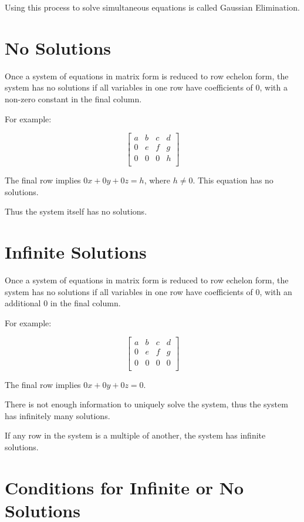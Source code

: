 \documentclass[a4paper,11pt]{article}
\begin{document}
Using this process to solve simultaneous equations is called Gaussian
Elimination.



\section{No Solutions}

Once a system of equations in matrix form is reduced to row echelon form, the
system has no solutions if all variables in one row have coefficients of 0,
with a non-zero constant in the final column.

For example:

$$
\begin{bmatrix}
a & b & c & d \\
0 & e & f & g \\
0 & 0 & 0 & h \\
\end{bmatrix}
$$

The final row implies $0x + 0y + 0z = h$, where $h \neq 0$. This equation has
no solutions.

Thus the system itself has no solutions.




\section{Infinite Solutions}

Once a system of equations in matrix form is reduced to row echelon form, the
system has no solutions if all variables in one row have coefficients of 0,
with an additional 0 in the final column.

For example:

$$
\begin{bmatrix}
a & b & c & d \\
0 & e & f & g \\
0 & 0 & 0 & 0 \\
\end{bmatrix}
$$

The final row implies $0x + 0y + 0z = 0$.

There is not enough information to uniquely solve the system, thus the system
has infinitely many solutions.

If any row in the system is a multiple of another, the system has infinite
solutions.




\section{Conditions for Infinite or No Solutions}
\end{document}
